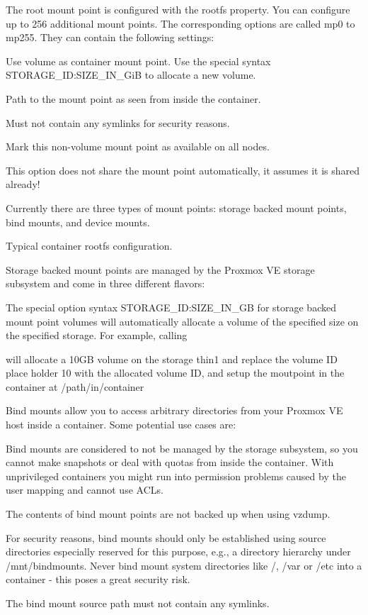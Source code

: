 The root mount point is configured with the rootfs property. You can configure up to 256 additional mount points. The corresponding options are called mp0 to mp255. They can contain the following settings:

Use volume as container mount point. Use the special syntax STORAGE_ID:SIZE_IN_GiB to allocate a new volume.

Path to the mount point as seen from inside the container.

Must not contain any symlinks for security reasons.

Mark this non-volume mount point as available on all nodes.

This option does not share the mount point automatically, it assumes it is shared already!

Currently there are three types of mount points: storage backed mount points, bind mounts, and device mounts.

Typical container rootfs configuration.

Storage backed mount points are managed by the Proxmox VE storage subsystem and come in three different flavors:

The special option syntax STORAGE_ID:SIZE_IN_GB for storage backed mount point volumes will automatically allocate a volume of the specified size on the specified storage. For example, calling

will allocate a 10GB volume on the storage thin1 and replace the volume ID place holder 10 with the allocated volume ID, and setup the moutpoint in the container at /path/in/container

Bind mounts allow you to access arbitrary directories from your Proxmox VE host inside a container. Some potential use cases are:

Bind mounts are considered to not be managed by the storage subsystem, so you cannot make snapshots or deal with quotas from inside the container. With unprivileged containers you might run into permission problems caused by the user mapping and cannot use ACLs.

The contents of bind mount points are not backed up when using vzdump.

For security reasons, bind mounts should only be established using source directories especially reserved for this purpose, e.g., a directory hierarchy under /mnt/bindmounts. Never bind mount system directories like /, /var or /etc into a container - this poses a great security risk.

The bind mount source path must not contain any symlinks.

